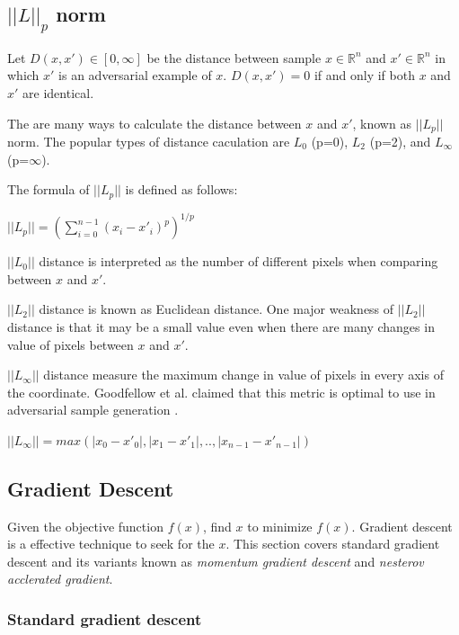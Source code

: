 \documentclass[12pt]{article}
\begin{document}
\subsection{$||L||_p$ norm}

Let $D(x, x') \in [0, \infty]$ be the distance between sample $x \in \mathbb{R}^n$ and $x' \in \mathbb{R}^n$ in which $x'$ is an adversarial example of $x$. $D(x, x') = 0$ if and only if both $x$ and $x'$ are identical.

The are many ways to calculate the distance between $x$ and $x'$, known as $ ||L_p||$ norm. The popular types of distance caculation are $L_0$ (p=0), $L_2$ (p=2), and $L_\infty$ (p=$\infty$).

The formula of $||L_p||$ is defined as follows:

\begin{center}
	$||L_p|| = (\sum_{i=0}^{n-1} (x_i-x'_i)^p)^{1/p} $
\end{center}

$||L_0||$ distance is interpreted as the number of different pixels when comparing between $x$ and $x'$.

$||L_2||$ distance is known as Euclidean distance. One major weakness of $||L_2||$ distance is that it may be a small value even when there are many changes in value of pixels between $x$ and $x'$.

$||L_\infty||$ distance measure the maximum change in value of pixels in every axis of the coordinate. Goodfellow et al. claimed that this metric is optimal to use in adversarial sample generation \cite{DBLP:journals/corr/GrossePM0M16}.

\begin{center}
	$||L_\infty|| = max(|x_0 - x'_0|, |x_1 - x'_1|, .., |x_{n-1} - x'_{n-1}|)$ 
\end{center}

\subsection{Gradient Descent}

Given the objective function $f(x)$, find $x$ to minimize $f(x)$. Gradient descent is a effective technique to seek for the $x$. This section covers standard gradient descent and its variants known as \textit{momentum gradient descent} and \textit{nesterov acclerated gradient}.

\subsubsection{Standard gradient descent}
	
\end{document}
